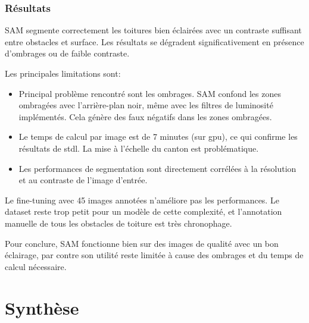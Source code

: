 \subsubsection{Résultats}

SAM segmente correctement les toitures bien éclairées avec un contraste suffisant entre obstacles et surface. Les résultats se dégradent significativement en présence d'ombrages ou de faible contraste.

Les principales limitations sont:
\begin{itemize}
    \item Principal problème rencontré sont les ombrages. SAM confond les zones ombragées avec l'arrière-plan noir, même avec les filtres de luminosité implémentés. Cela génère des faux négatifs dans les zones ombragées.
    \item Le temps de calcul par image est de 7 minutes (sur \acrshort{gpu}), ce qui confirme les résultats de \acrshort{stdl}. La mise à l'échelle du canton est problématique.
    \item Les performances de segmentation sont directement corrélées à la résolution et au contraste de l'image d'entrée.
\end{itemize}

Le fine-tuning avec 45 images annotées n'améliore pas les performances. Le dataset reste trop petit pour un modèle de cette complexité, et l'annotation manuelle de tous les obstacles de toiture est très chronophage.

Pour conclure, SAM fonctionne bien sur des images de qualité avec un bon éclairage, par contre son utilité reste limitée à cause des ombrages et du temps de calcul nécessaire.

\section{Synthèse}